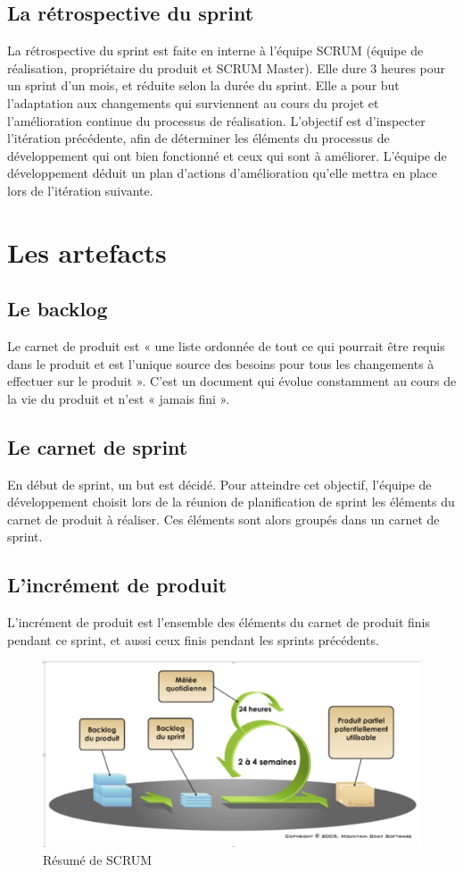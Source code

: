 \documentclass[a4paper,12pt]{book}
\theoremstyle{break}
\begin{document}
\subsection{La rétrospective du sprint}
La rétrospective du sprint est faite en interne à l'équipe SCRUM (équipe de réalisation, propriétaire du produit et SCRUM Master). Elle dure 3 heures pour un sprint d'un mois, et réduite selon la durée du sprint. Elle a pour but l'adaptation aux changements qui surviennent au cours du projet et l'amélioration continue du processus de réalisation.
L'objectif est d’inspecter l'itération précédente, afin de déterminer les éléments du processus de développement qui ont bien fonctionné et ceux qui sont à améliorer. L'équipe de développement déduit un plan d'actions d'amélioration qu'elle mettra en place lors de l'itération suivante.

\section{Les artefacts}
\subsection{Le backlog}
Le carnet de produit est « une liste ordonnée de tout ce qui pourrait être requis dans le produit et est l'unique source des besoins pour tous les changements à effectuer sur le produit ». C'est un document qui évolue constamment au cours de la vie du produit et n'est « jamais fini ».

\subsection{Le carnet de sprint} 
En début de sprint, un but est décidé. Pour atteindre cet objectif, l'équipe de développement choisit lors de la réunion de planification de sprint les éléments du carnet de produit à réaliser. Ces éléments sont alors groupés dans un carnet de sprint.

\subsection{L'incrément de produit}
L'incrément de produit est l'ensemble des éléments du carnet de produit finis pendant ce sprint, et aussi ceux finis pendant les sprints précédents. 
\begin{figure}[h!]
    \centering
    \includegraphics[width=1.1\textwidth]{scrum}
    \caption{Résumé de SCRUM}
    \label{fig:scrum}
\end{figure}
\end{document}
